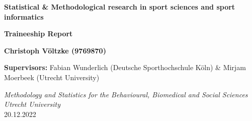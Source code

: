 \documentclass{article}
\begin{document}
\begin{titlepage}
   \begin{center}
       \vspace*{1cm}

       \LARGE\textbf{Statistical \& Methodological research in sport sciences and sport informatics}

            
       \vspace{1.5cm}

        \Large\textbf{Traineeship Report}

        \vspace{1.5cm}
        
        \large\textbf{Christoph Völtzke (9769870)}

        \vspace{2.5 cm}
 
        \textbf{Supervisors:} Fabian Wunderlich (Deutsche Sporthochschule Köln) \& Mirjam Moerbeek (Utrecht University)\\
        
       \vspace{2.5 cm}
       
       \textit{Methodology and Statistics for the Behavioural, Biomedical and Social Sciences}\\
       
       \vspace{1 cm}
       \textit{Utrecht University}\\
       \vspace{1 cm}
        20.12.2022 \\
   \end{center}
\end{titlepage}


\newpage


\newpage
\printbibliography
\newpage

\end{document}

